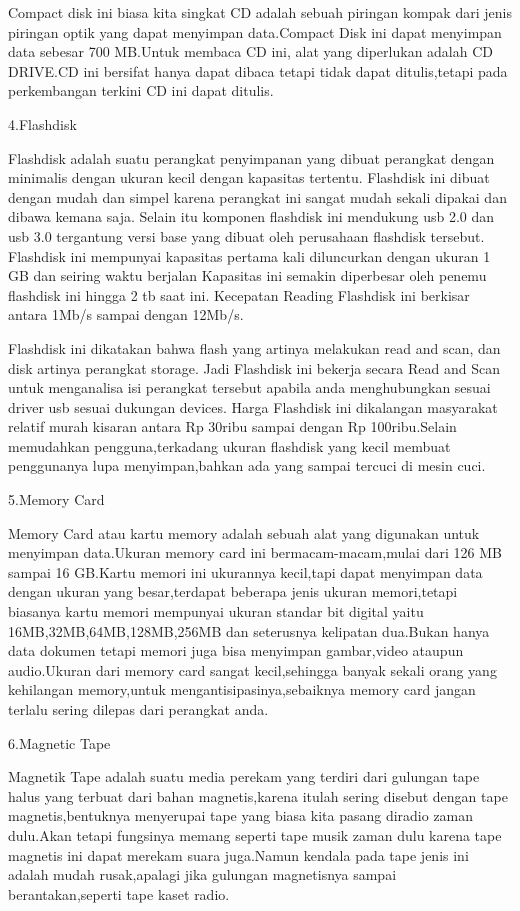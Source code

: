 Compact disk ini biasa kita singkat CD adalah sebuah piringan kompak dari jenis piringan optik yang dapat menyimpan data.Compact Disk ini dapat menyimpan data sebesar 700 MB.Untuk membaca CD ini, alat yang diperlukan adalah CD DRIVE.CD ini bersifat hanya dapat dibaca tetapi tidak dapat ditulis,tetapi pada perkembangan terkini CD ini dapat ditulis.

4.Flashdisk

Flashdisk adalah suatu perangkat penyimpanan yang dibuat perangkat dengan minimalis dengan ukuran kecil dengan kapasitas tertentu. Flashdisk ini dibuat dengan
mudah dan simpel karena perangkat ini sangat mudah sekali dipakai dan dibawa kemana saja. Selain itu komponen flashdisk ini mendukung usb 2.0 dan usb 3.0 tergantung
versi base yang dibuat oleh perusahaan flashdisk tersebut. Flashdisk ini mempunyai kapasitas pertama kali diluncurkan dengan ukuran 1 GB dan seiring waktu berjalan
Kapasitas ini semakin diperbesar oleh penemu flashdisk ini hingga 2 tb saat ini. Kecepatan Reading Flashdisk ini berkisar antara 1Mb/s sampai dengan 12Mb/s.

Flashdisk ini dikatakan bahwa flash yang artinya melakukan read and scan, dan disk artinya perangkat storage. Jadi Flashdisk ini bekerja secara Read and Scan untuk
menganalisa isi perangkat tersebut apabila anda menghubungkan sesuai driver usb sesuai dukungan devices. Harga Flashdisk ini dikalangan masyarakat relatif murah
kisaran antara Rp 30ribu sampai dengan Rp 100ribu.Selain memudahkan pengguna,terkadang ukuran flashdisk yang kecil membuat penggunanya lupa menyimpan,bahkan ada yang sampai tercuci di mesin cuci.

5.Memory Card

Memory Card atau kartu memory adalah sebuah alat yang digunakan untuk menyimpan data.Ukuran memory card ini bermacam-macam,mulai dari 126 MB sampai 16 GB.Kartu memori ini ukurannya kecil,tapi dapat menyimpan data dengan ukuran yang besar,terdapat beberapa jenis ukuran memori,tetapi biasanya kartu memori mempunyai ukuran standar bit digital yaitu 16MB,32MB,64MB,128MB,256MB dan seterusnya kelipatan dua.Bukan hanya data dokumen tetapi memori juga bisa menyimpan gambar,video ataupun audio.Ukuran dari memory card sangat kecil,sehingga banyak sekali orang yang kehilangan memory,untuk mengantisipasinya,sebaiknya memory card jangan terlalu sering dilepas dari perangkat anda.

6.Magnetic Tape

Magnetik Tape adalah suatu media perekam yang terdiri dari gulungan tape halus yang terbuat dari bahan magnetis,karena itulah sering disebut dengan tape magnetis,bentuknya menyerupai tape yang biasa kita pasang diradio zaman dulu.Akan tetapi fungsinya memang seperti tape musik zaman dulu karena tape magnetis ini dapat merekam suara juga.Namun kendala pada tape jenis ini adalah mudah rusak,apalagi jika gulungan magnetisnya sampai berantakan,seperti tape kaset radio.

